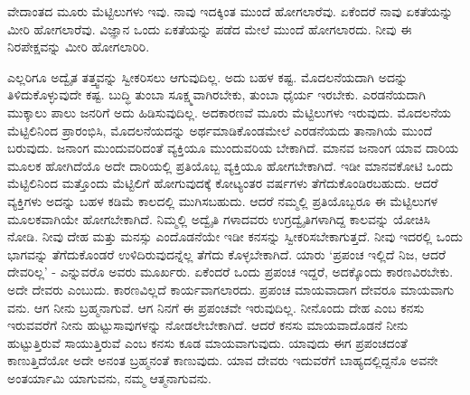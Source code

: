 ವೇದಾಂತದ ಮೂರು ಮೆಟ್ಟಿಲುಗಳು ಇವು. ನಾವು ಇದಕ್ಕಿಂತ ಮುಂದೆ ಹೋಗಲಾರೆವು. ಏಕೆಂದರೆ ನಾವು ಏಕತೆಯನ್ನು ಮೀರಿ ಹೋಗಲಾರೆವು. ವಿಜ್ಞಾನ ಒಂದು ಏಕತೆಯನ್ನು ಪಡೆದ ಮೇಲೆ ಮುಂದೆ ಹೋಗಲಾರದು. ನೀವು ಈ ನಿರಪೇಕ್ಷವನ್ನು ಮೀರಿ ಹೋಗಲಾರಿರಿ.

ಎಲ್ಲರಿಗೂ ಅದ್ವೈತ ತತ್ತ್ವವನ್ನು ಸ್ವೀಕರಿಸಲು ಆಗುವುದಿಲ್ಲ. ಅದು ಬಹಳ ಕಷ್ಟ. ಮೊದಲನೆಯದಾಗಿ ಅದನ್ನು ತಿಳಿದುಕೊಳ್ಳುವುದೇ ಕಷ್ಟ. ಬುದ್ಧಿ ತುಂಬಾ ಸೂಕ್ಷ್ಮವಾಗಿರಬೇಕು, ತುಂಬಾ ಧೈರ್ಯ ಇರಬೇಕು. ಎರಡನೆಯದಾಗಿ ಮುಕ್ಕಾಲು ಪಾಲು ಜನರಿಗೆ ಅದು ಹಿಡಿಸುವುದಿಲ್ಲ. ಅದಕಾರಣವೆ ಮೂರು ಮೆಟ್ಟಿಲುಗಳು ಇರುವುದು. ಮೊದಲನೆಯ ಮೆಟ್ಟಿಲಿನಿಂದ ಪ್ರಾರಂಭಿಸಿ, ಮೊದಲನೆಯದನ್ನು ಅರ್ಥಮಾಡಿಕೊಂಡಮೇಲೆ ಎರಡನೆಯದು ತಾನಾಗಿಯೆ ಮುಂದೆ ಬರುವುದು. ಜನಾಂಗ ಮುಂದುವರಿದಂತೆ ವ್ಯಕ್ತಿಯೂ ಮುಂದುವರಿಯ ಬೇಕಾಗಿದೆ. ಮಾನವ ಜನಾಂಗ ಯಾವ ದಾರಿಯ ಮೂಲಕ ಹೋಗಿದೆಯೊ ಅದೇ ದಾರಿಯಲ್ಲಿ ಪ್ರತಿಯೊಬ್ಬ ವ್ಯಕ್ತಿಯೂ ಹೋಗಬೇಕಾಗಿದೆ. ಇಡೀ ಮಾನವಕೋಟಿ ಒಂದು ಮೆಟ್ಟಿಲಿನಿಂದ ಮತ್ತೊಂದು ಮೆಟ್ಟಿಲಿಗೆ ಹೋಗುವುದಕ್ಕೆ ಕೋಟ್ಯಂತರ ವರ್ಷಗಳು ತೆಗೆದುಕೊಂಡಿರಬಹುದು. ಆದರೆ ವ್ಯಕ್ತಿಗಳು ಅದನ್ನು ಬಹಳ ಕಡಿಮೆ ಕಾಲದಲ್ಲಿ ಮುಗಿಸಬಹುದು. ಆದರೆ ನಮ್ಮಲ್ಲಿ ಪ್ರತಿಯೊಬ್ಬರೂ ಈ ಮೆಟ್ಟಿಲುಗಳ ಮೂಲಕವಾಗಿಯೇ ಹೋಗಬೇಕಾಗಿದೆ. ನಿಮ್ಮಲ್ಲಿ ಅದ್ವೈತಿ ಗಳಾದವರು ಉಗ್ರದ್ವೈತಿಗಳಾಗಿದ್ದ ಕಾಲವನ್ನು ಯೋಚಿಸಿ ನೋಡಿ. ನೀವು ದೇಹ ಮತ್ತು ಮನಸ್ಸು ಎಂದೊಡನೆಯೇ ಇಡೀ ಕನಸನ್ನು ಸ್ವೀಕರಿಸಬೇಕಾಗುತ್ತದೆ. ನೀವು ಇದರಲ್ಲಿ ಒಂದು ಭಾಗವನ್ನು ತೆಗೆದುಕೊಂಡರೆ ಉಳಿದಿರುವುದನ್ನೆಲ್ಲ ತೆಗೆದು ಕೊಳ್ಳಬೇಕಾಗಿದೆ. ಯಾರು ‘ಪ್ರಪಂಚ ಇಲ್ಲಿದೆ ನಿಜ, ಆದರೆ ದೇವರಿಲ್ಲ’ - ಎನ್ನುವರೊ ಅವರು ಮೂರ್ಖರು. ಏಕೆಂದರೆ ಒಂದು ಪ್ರಪಂಚ ಇದ್ದರೆ, ಅದಕ್ಕೊಂದು ಕಾರಣವಿರಬೇಕು. ಅದೇ ದೇವರು ಎಂಬುದು. ಕಾರಣವಿಲ್ಲದೆ ಕಾರ್ಯವಾಗಲಾರದು. ಪ್ರಪಂಚ ಮಾಯವಾದಾಗ ದೇವರೂ ಮಾಯವಾಗು ವನು. ಆಗ ನೀನು ಬ್ರಹ್ಮನಾಗುವೆ. ಆಗ ನಿನಗೆ ಈ ಪ್ರಪಂಚವೇ ಇರುವುದಿಲ್ಲ. ನೀನೊಂದು ದೇಹ ಎಂಬ ಕನಸು ಇರುವವರೆಗೆ ನೀನು ಹುಟ್ಟುಸಾವುಗಳನ್ನು ನೋಡಲೇಬೇಕಾಗಿದೆ. ಆದರೆ ಕನಸು ಮಾಯವಾದೊಡನೆ ನೀನು ಹುಟ್ಟುತ್ತಿರುವೆ ಸಾಯುತ್ತಿರುವೆ ಎಂಬ ಕನಸು ಕೂಡ ಮಾಯವಾಗುವುದು. ಯಾವುದು ಈಗ ಪ್ರಪಂಚದಂತೆ ಕಾಣುತ್ತಿದೆಯೋ ಅದೇ ಅನಂತ ಬ್ರಹ್ಮನಂತೆ ಕಾಣುವುದು. ಯಾವ ದೇವರು ಇದುವರೆಗೆ ಬಾಹ್ಯದಲ್ಲಿದ್ದನೊ ಅವನೇ ಅಂತರ್ಯಾಮಿ ಯಾಗುವನು, ನಮ್ಮ ಆತ್ಮನಾಗುವನು.


